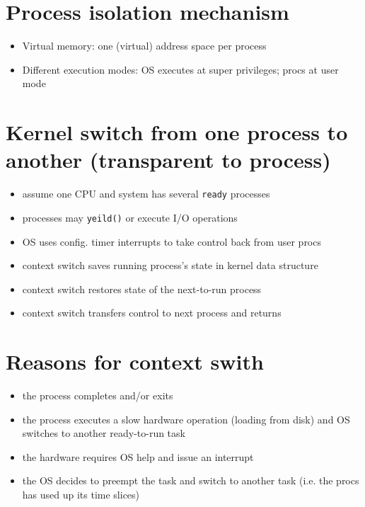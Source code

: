 \section*{Process isolation mechanism}
\begin{itemize}
\item Virtual memory: one (virtual) address space per process
\item Different execution modes: OS executes at super privileges; procs at user mode
\end{itemize}
\section*{Kernel switch from one process to another (transparent to process)}
\begin{itemize}
\item assume one CPU and system has several \texttt{ready} processes
\item processes may \texttt{yeild()} or execute I/O operations
\item OS uses config. timer interrupts to take control back from user procs
\item context switch saves running process's state in kernel data structure
\item context switch restores state of the next-to-run process
\item context switch transfers control to next process and returns
\end{itemize}
\section*{Reasons for context swith}
\begin{itemize}
\item the process completes and/or exits
\item the process executes a slow hardware operation (loading from disk) and OS switches to another ready-to-run task
\item the hardware requires OS help and issue an interrupt
\item the OS decides to preempt the task and switch to another task (i.e. the procs has used up its time slices)
\end{itemize}
